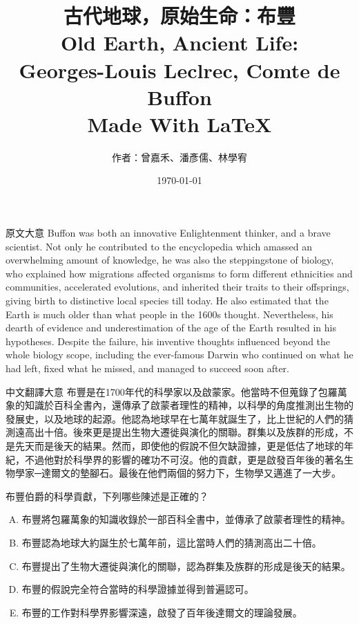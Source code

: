 \documentclass[
	a4paper,
	fontsize=11pt,
	twoside=true,
	numbers=noenddot,
]{article}
\begin{document}
\begin{large}
\begin{titlepage}
\title{\Huge{\textbf{古代地球，原始生命：布豐\\}
Old Earth, Ancient Life:\\
Georges-Louis Leclrec, Comte de Buffon\\
Made With \LaTeX
}}

\date{\today}
\author{\LARGE 作者：曾嘉禾、潘彥儒、林學宥}
\end{titlepage}
\maketitle
\newpage
\begin{boxpar}{原文大意}
Buffon was both an innovative Enlightenment thinker, and a brave
scientist. Not only he contributed to the encyclopedia which amassed an
overwhelming amount of knowledge, he was also the steppingstone of
biology, who explained how migrations affected organisms to form
different ethnicities and communities, accelerated evolutions, and
inherited their traits to their offsprings, giving birth to distinctive
local species till today. He also estimated that the Earth is much older
than what people in the 1600s thought. Nevertheless, his dearth of
evidence and underestimation of the age of the Earth resulted in his
hypotheses. Despite the failure, his inventive thoughts influenced
beyond the whole biology scope, including the ever-famous Darwin who
continued on what he had left, fixed what he missed, and managed to
succeed soon after.
\end{boxpar}
\begin{boxpar}{中文翻譯大意}
布豐是在1700年代的科學家以及啟蒙家。他當時不但蒐錄了包羅萬象的知識於百科全書內，還傳承了啟蒙者理性的精神，以科學的角度推測出生物的發展史，以及地球的起源。他認為地球早在七萬年就誕生了，比上世紀的人們的猜測遠高出十倍。後來更是提出生物大遷徙與演化的關聯。群集以及族群的形成，不是先天而是後天的結果。然而，即使他的假說不但欠缺證據，更是低估了地球的年紀，不過他對於科學界的影響的確功不可沒。他的貢獻，更是啟發百年後的著名生物學家─達爾文的墊腳石。最後在他們兩個的努力下，生物學又邁進了一大步。
\end{boxpar}
\begin{tcolorbox}[title=多選題,colback=green!5!white,colframe=green!75!black]

布豐伯爵的科學貢獻，下列哪些陳述是正確的？\\

\begin{enumerate}[(A)]
    \item 布豐將包羅萬象的知識收錄於一部百科全書中，並傳承了啟蒙者理性的精神。
    \item 布豐認為地球大約誕生於七萬年前，這比當時人們的猜測高出二十倍。
    \item 布豐提出了生物大遷徙與演化的關聯，認為群集及族群的形成是後天的結果。
    \item 布豐的假說完全符合當時的科學證據並得到普遍認可。
    \item 布豐的工作對科學界影響深遠，啟發了百年後達爾文的理論發展。
\end{enumerate}


\end{tcolorbox}
\end{large}
\end{document}

